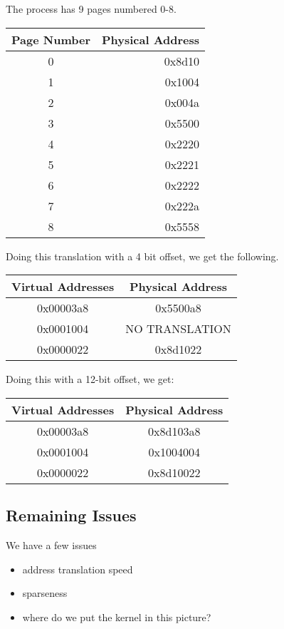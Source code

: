\documentclass[12pt]{article}
\begin{document}
The process has 9 pages numbered 0-8.

\begin{center}
	\begin{tabular}{|c|r|}
		\hline
		Page Number & Physical Address \\
		\hline
		0 & 0x8d10\\
		1 & 0x1004\\
		2 & 0x004a\\
		3 & 0x5500\\
		4 & 0x2220\\
		5 & 0x2221\\
		6 & 0x2222\\
		7 & 0x222a\\
		8 & 0x5558\\
		\hline
	\end{tabular}
\end{center}

Doing this translation with a 4 bit offset, we get the following.
\begin{center}
	\begin{tabular}{|c|c|}
		\hline
		Virtual Addresses & Physical Address\\
		\hline
		0x00003a8 & 0x5500a8 \\
		0x0001004 & NO TRANSLATION \\
		0x0000022 & 0x8d1022 \\
		\hline
	\end{tabular}
\end{center}

Doing this with a 12-bit offset, we get:
\begin{center}
	\begin{tabular}{|c|c|}
		\hline
		Virtual Addresses & Physical Address\\
		\hline
		0x00003a8 & 0x8d103a8 \\
		0x0001004 & 0x1004004 \\
		0x0000022 & 0x8d10022 \\
		\hline
	\end{tabular}
\end{center}

\subsection{Remaining Issues}

We have a few issues
\begin{itemize}
	\item address translation speed
	\item sparseness
	\item where do we put the kernel in this picture?
\end{itemize}
\end{document}

